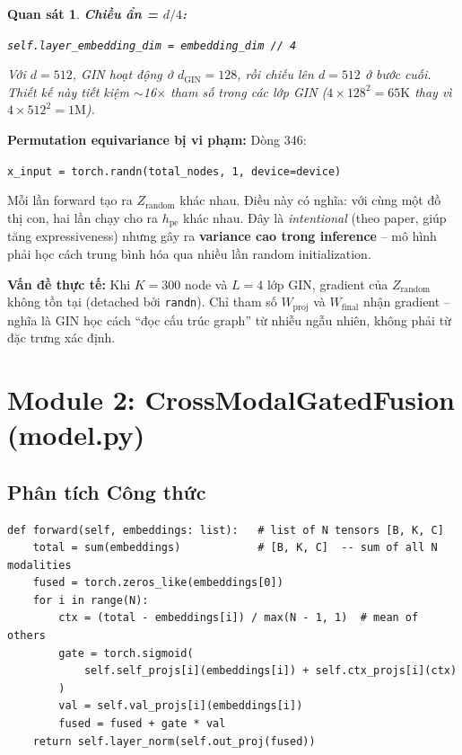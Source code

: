 \documentclass[12pt,a4paper]{article}
\newtheorem{observation}{Quan sát}[section]
\begin{document}
\begin{observation}
\textbf{Chiều ẩn = $d/4$:}
\begin{center}
\texttt{self.layer\_embedding\_dim = embedding\_dim // 4}
\end{center}
Với $d=512$, GIN hoạt động ở $d_\text{GIN}=128$, rồi chiếu lên $d=512$ ở bước cuối.
Thiết kế này tiết kiệm $\sim$16$\times$ tham số trong các lớp GIN
($4 \times 128^2 = 65\text{K}$ thay vì $4 \times 512^2 = 1\text{M}$).
\end{observation}

\begin{issuebox}
\textbf{Permutation equivariance bị vi phạm:} Dòng 346:
\begin{center}
\texttt{x\_input = torch.randn(total\_nodes, 1, device=device)}
\end{center}
Mỗi lần forward tạo ra $Z_\text{random}$ khác nhau. Điều này có nghĩa:
với cùng một đồ thị con, hai lần chạy cho ra $h_\text{pe}$ khác nhau.
Đây là \emph{intentional} (theo paper, giúp tăng expressiveness) nhưng
gây ra \textbf{variance cao trong inference} -- mô hình phải học cách
trung bình hóa qua nhiều lần random initialization.

\textbf{Vấn đề thực tế:} Khi $K=300$ node và $L=4$ lớp GIN, gradient
của $Z_\text{random}$ không tồn tại (detached bởi \texttt{randn}).
Chỉ tham số $W_\text{proj}$ và $W_\text{final}$ nhận gradient -- nghĩa là
GIN học cách ``đọc cấu trúc graph'' từ nhiễu ngẫu nhiên, không phải từ
đặc trưng xác định.
\end{issuebox}

\section{Module 2: CrossModalGatedFusion (model.py)}

\subsection{Phân tích Công thức}

\begin{codebox}[title={model.py -- CrossModalGatedFusion.forward()}]
\begin{lstlisting}
def forward(self, embeddings: list):   # list of N tensors [B, K, C]
    total = sum(embeddings)            # [B, K, C]  -- sum of all N modalities
    fused = torch.zeros_like(embeddings[0])
    for i in range(N):
        ctx = (total - embeddings[i]) / max(N - 1, 1)  # mean of others
        gate = torch.sigmoid(
            self.self_projs[i](embeddings[i]) + self.ctx_projs[i](ctx)
        )
        val = self.val_projs[i](embeddings[i])
        fused = fused + gate * val
    return self.layer_norm(self.out_proj(fused))
\end{lstlisting}
\end{codebox}
\end{document}

